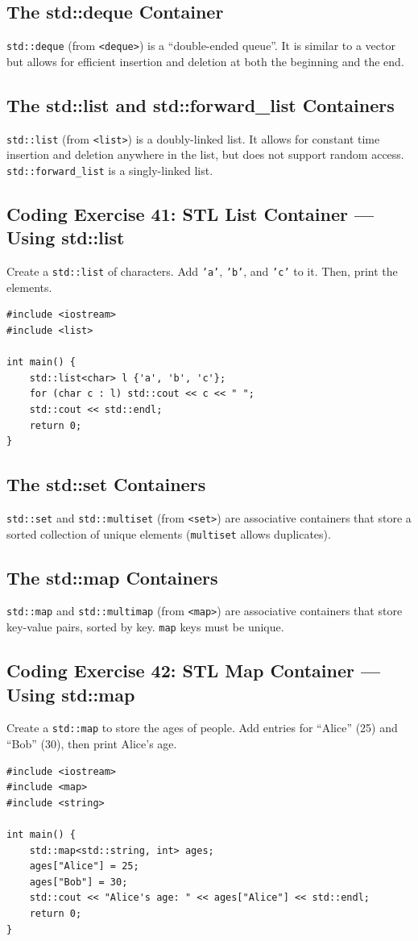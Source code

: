 \subsection{The std::deque Container}
\texttt{std::deque} (from \texttt{<deque>}) is a ``double-ended queue''. It is similar to a vector but allows for efficient insertion and deletion at both the beginning and the end.

\subsection{The std::list and std::forward\_list Containers}
\texttt{std::list} (from \texttt{<list>}) is a doubly-linked list. It allows for constant time insertion and deletion anywhere in the list, but does not support random access. \texttt{std::forward\_list} is a singly-linked list.

\subsection{Coding Exercise 41: STL List Container --- Using std::list}
Create a \texttt{std::list} of characters. Add \texttt{'a'}, \texttt{'b'}, and \texttt{'c'} to it. Then, print the elements.
\begin{lstlisting}
#include <iostream>
#include <list>

int main() {
	std::list<char> l {'a', 'b', 'c'};
	for (char c : l) std::cout << c << " ";
	std::cout << std::endl;
	return 0;
}
\end{lstlisting}

\subsection{The std::set Containers}
\texttt{std::set} and \texttt{std::multiset} (from \texttt{<set>}) are associative containers that store a sorted collection of unique elements (\texttt{multiset} allows duplicates).

\subsection{The std::map Containers}
\texttt{std::map} and \texttt{std::multimap} (from \texttt{<map>}) are associative containers that store key-value pairs, sorted by key. \texttt{map} keys must be unique.

\subsection{Coding Exercise 42: STL Map Container --- Using std::map}
Create a \texttt{std::map} to store the ages of people. Add entries for ``Alice'' (25) and ``Bob'' (30), then print Alice's age.
\begin{lstlisting}
#include <iostream>
#include <map>
#include <string>

int main() {
	std::map<std::string, int> ages;
	ages["Alice"] = 25;
	ages["Bob"] = 30;
	std::cout << "Alice's age: " << ages["Alice"] << std::endl;
	return 0;
}
\end{lstlisting}

